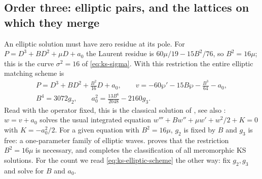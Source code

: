 \subsection{Order three: elliptic pairs, and the lattices on which they
merge}\label{sec:ks}

An elliptic solution must have zero residue at its pole. For
\(P=D^3+BD^2+\mu D+a_0\) the Laurent residue is
\(60\mu/19-15B^2/76\), so \(B^2=16\mu\); this is the curve
\(\sigma^2=16\) of \eqref{eq:ks-sigma}. With this restriction the
entire elliptic matching scheme is
\begin{equation}\label{eq:ks-elliptic-scheme}
 \begin{gathered}
 P=D^3+B D^2+\frac{B^2}{16}D+a_0,\qquad
 v=-60\wp'-15B\wp-\frac{B^3}{64}-a_0,\\
 B^4=3072g_2,\qquad
 a_0^2=\frac{13B^6}{2048}-2160g_3.
 \end{gathered}
\end{equation}
Read with the operator fixed, this is the classical solution of
\citet{Kudryashov1990}, see also \citet{Kudryashov1991}: \(w=v+a_0\)
solves the usual integrated equation
\(w'''+Bw''+\mu w'+w^2/2+K=0\) with \(K=-a_0^2/2\). For a given
equation with \(B^2=16\mu\), \(g_2\) is fixed by \(B\) and \(g_3\) is
free: a one-parameter family of elliptic waves. \citet{Hone2005} proves
that the restriction \(B^2=16\mu\) is necessary, and
\citet{Eremenko2006} completes the classification of all meromorphic KS
solutions. For the count we read \eqref{eq:ks-elliptic-scheme} the
other way: fix \(g_2,g_3\) and solve for \(B\) and \(a_0\).

